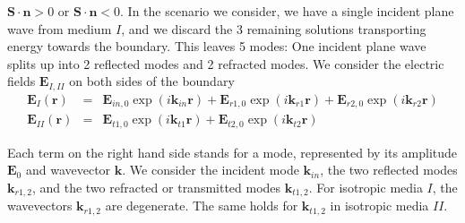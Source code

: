 \documentclass[12pt,a4paper,twoside,openright,BCOR10mm,headsepline,titlepage,abstracton,chapterprefix,final]{scrreprt}
\newcommand\Vector[1]{{\mathbf{#1}}}
\newcommand\Location{\Vector{r}}
\newcommand\wavenumber{k}
\newcommand\Wavevector{\Vector{\wavenumber}}
\newcommand\scalarEfield{E}
\newcommand\Efield{\Vector{\scalarEfield}}
\newcommand\materialone{I}
\newcommand\materialtwo{{II}}
\begin{document}
$\Vector{S}\cdot\Vector{n}>0$ or $\Vector{S}\cdot\Vector{n}<0$.
In the scenario we consider, we have a single incident plane wave from medium $\materialone$, 
and we discard the 3 remaining solutions transporting energy towards the boundary.
This leaves 5 modes: One incident plane wave splits up into 2 reflected modes and 2 refracted modes.
We consider the electric fields $\Efield_{\materialone,\materialtwo}$ on both sides of the boundary
\begin{subequations}
\begin{eqnarray}
 \Efield_\materialone(\Location) &=& \Efield_{in,0} \exp(i \Wavevector_{in} \Location) + \Efield_{r1,0} \exp(i \Wavevector_{r1} \Location) + \Efield_{r2,0} \exp(i \Wavevector_{r2} \Location)  \\
 \Efield_\materialtwo(\Location) &=& \Efield_{t1,0} \exp(i \Wavevector_{t1} \Location) + \Efield_{t2,0} \exp(i \Wavevector_{t2} \Location)
\end{eqnarray}
\label{eq:modes_on_boundary} 
\end{subequations}

Each term on the right hand side stands for a mode, represented by its amplitude $\Efield_{0}$ and wavevector $\Wavevector$.
We consider the incident mode $\Wavevector_{in}$, 
the two reflected modes $\Wavevector_{r1,2}$,
and the two refracted or transmitted modes $\Wavevector_{t1,2}$.
For isotropic media $\materialone$, the wavevectors $\Wavevector_{r1,2}$ are degenerate. 
The same holds for $\Wavevector_{t1,2}$ in isotropic media $\materialtwo$.
\end{document}
